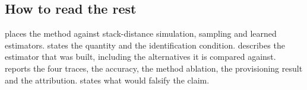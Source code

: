 \subsection{How to read the rest}

 places the method against stack-distance simulation,
sampling and learned estimators.  states the quantity and
the identification condition.  describes the estimator that was
built, including the alternatives it is compared against.
 reports the four traces, the accuracy, the method ablation,
the provisioning result and the attribution.  states what
would falsify the claim.
